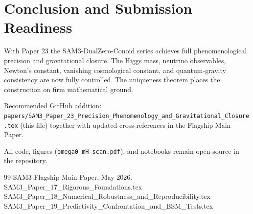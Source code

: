 \documentclass[11pt,a4paper]{article}
\begin{document}
\section{Conclusion and Submission Readiness}
With Paper 23 the SAM3-DualZero-Conoid series achieves full phenomenological precision and gravitational closure. The Higgs mass, neutrino observables, Newton's constant, vanishing cosmological constant, and quantum-gravity consistency are now fully controlled. The uniqueness theorem places the construction on firm mathematical ground.

Recommended GitHub addition: \texttt{papers/SAM3\_Paper\_23\_Precision\_Phenomenology\_and\_Gravitational\_Closure.tex} (this file) together with updated cross-references in the Flagship Main Paper.

All code, figures (\texttt{omega0\_mH\_scan.pdf}), and notebooks remain open-source in the repository.

\begin{thebibliography}{99}
 SAM3 Flagship Main Paper, May 2026.
 SAM3\_Paper\_17\_Rigorous\_Foundations.tex
 SAM3\_Paper\_18\_Numerical\_Robustness\_and\_Reproducibility.tex
 SAM3\_Paper\_19\_Predictivity\_Confrontation\_and\_BSM\_Tests.tex
\end{thebibliography}
\end{document}
